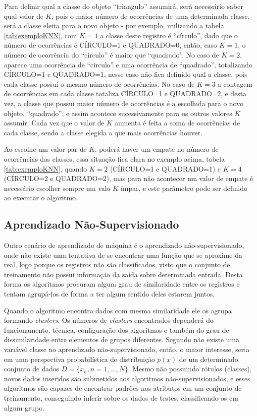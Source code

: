 Para definir qual a classe do objeto ``triangulo'' assumirá, será necessário saber qual valor de ${K}$, pois o maior número de ocorrências de uma determinada classe, será a classe eleita para o novo objeto - por exemplo, utilizando a tabela \ref{tab:exemploKNN}, com ${K=1}$ a classe deste registro é ``círculo'', dado que o número de ocorrências é CÍRCULO=1 e QUADRADO=0, então, caso ${K=1}$, o número de ocorrência do ``círculo'' é maior que ``quadrado''. No caso de ${K=2}$, aparece uma ocorrência de ``círculo'' e uma ocorrência de ``quadrado'', totalizando CÍRCULO=1 e QUADRADO=1, nesse caso não fica definido qual a classe, pois cada classe possui o mesmo número de ocorrências. No caso de ${K=3}$ a contagem de ocorrências em cada classe totaliza CÍRCULO=1 e QUADRADO=2, e desta vez, a classe que possui maior número de ocorrências é a escolhida para o novo objeto, ``quadrado'', e assim acontece sucessivamente para os outros valores ${K}$ assumir. Cada vez que o valor de ${K}$ aumenta é feita  a soma de ocorrências de cada classe, sendo a classe elegida a que mais ocorrências houver.

Ao escolhe um valor par de ${K}$, poderá haver um empate no número de ocorrências das classes, essa situação fica clara no exemplo acima, tabela \ref{tab:exemploKNN}, quando ${K=2}$ (CÍRCULO=1 e QUADRADO=1) e ${K=4}$ (CÍRCULO=2 e QUADRADO=2), mas para não acontecer um valor de empate é necessário escolher sempre um valo ${K}$ ímpar, e este parâmetro pode ser definido ao executar o algoritmo.


\subsection{Aprendizado Não-Supervisionado}\label{ssec:aprendNSup}

Outro cenário de aprendizado de máquina é o aprendizado não-supervisionado, onde não existe uma tentativa de se encontrar uma função que se aproxime da real, logo porque os registros não são classificados, visto que o conjunto de treinamento não possui informação da saída sobre determinada entrada. Desta forma os algoritmos procuram algum grau de similaridade entre os registros e tentam agrupá-los de forma a ter algum sentido deles estarem juntos. 

Quando o algoritmo encontra dados com mesma similaridade ele os agrupa formando \textit{clusters}. Os números de \textit{clusters} encontrados dependerá do funcionamento, técnica, configuração dos algoritmos e também do grau de dissimilaridade entre elementos de grupos diferentes. Segundo \cite{Barber2011} não existe uma variável classe no aprendizado não-supervisionado, então, o maior interesse, seria em uma perspectiva probabilística de distribuição ${p(x)}$ de um determinado conjunto de dados ${D = \{x_{n},n=1,...,N\}}$. Mesmo não possuindo rótulos (classes), novos dados inseridos são submetidos aos algoritmos não-supervisionados, e esses algoritmos são capazes de encontrar padrões nos atributos em um conjunto de treinamento, conseguindo inferir sobre os dados de testes, classificando-os em algum grupo. 

